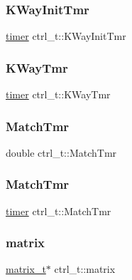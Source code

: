 \subsubsection{\texorpdfstring{K\+Way\+Init\+Tmr}{KWayInitTmr}}
{\footnotesize\ttfamily \hyperlink{a00978_aae821c36bb7e6918e1414484f939c3d4}{timer} ctrl\+\_\+t\+::\+K\+Way\+Init\+Tmr}

\mbox{\label{a00742_a4aa50bb891d35d0ef09d311db38f2e40}} 
\subsubsection{\texorpdfstring{K\+Way\+Tmr}{KWayTmr}}
{\footnotesize\ttfamily \hyperlink{a00978_aae821c36bb7e6918e1414484f939c3d4}{timer} ctrl\+\_\+t\+::\+K\+Way\+Tmr}

\mbox{\label{a00742_a2c485ca8bb306f86464745c86f4ea178}} 
\subsubsection{\texorpdfstring{Match\+Tmr}{MatchTmr}\hspace{0.1cm}{\footnotesize\ttfamily [1/2]}}
{\footnotesize\ttfamily double ctrl\+\_\+t\+::\+Match\+Tmr}

\mbox{\label{a00742_a9f0a9e7353849b3bf5caf432c3ea913e}} 
\subsubsection{\texorpdfstring{Match\+Tmr}{MatchTmr}\hspace{0.1cm}{\footnotesize\ttfamily [2/2]}}
{\footnotesize\ttfamily \hyperlink{a00978_aae821c36bb7e6918e1414484f939c3d4}{timer} ctrl\+\_\+t\+::\+Match\+Tmr}

\mbox{\label{a00742_a4dc8d1b4dd2561504f9c545068c9f5a8}} 
\subsubsection{\texorpdfstring{matrix}{matrix}}
{\footnotesize\ttfamily \hyperlink{a00754}{matrix\+\_\+t}$\ast$ ctrl\+\_\+t\+::matrix}

